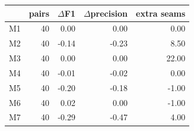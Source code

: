 \begin{tabular}{lrrrr}
\toprule
 & pairs & $\Delta$F1 & $\Delta$precision & extra seams \\
\midrule
M1 & 40 & 0.00 & 0.00 & 0.00 \\
M2 & 40 & -0.14 & -0.23 & 8.50 \\
M3 & 40 & 0.00 & 0.00 & 22.00 \\
M4 & 40 & -0.01 & -0.02 & 0.00 \\
M5 & 40 & -0.20 & -0.18 & -1.00 \\
M6 & 40 & 0.02 & 0.00 & -1.00 \\
M7 & 40 & -0.29 & -0.47 & 4.00 \\
\bottomrule
\end{tabular}
